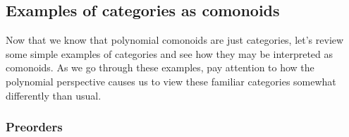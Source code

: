 \documentclass[Book-Poly]{subfiles}
\begin{document}
\subsection{Examples of categories as comonoids}
Now that we know that polynomial comonoids are just categories, let's review some simple examples of categories and see how they may be interpreted as comonoids.
As we go through these examples, pay attention to how the polynomial perspective causes us to view these familiar categories somewhat differently than usual. %

\subsubsection{Preorders}

\end{document}
